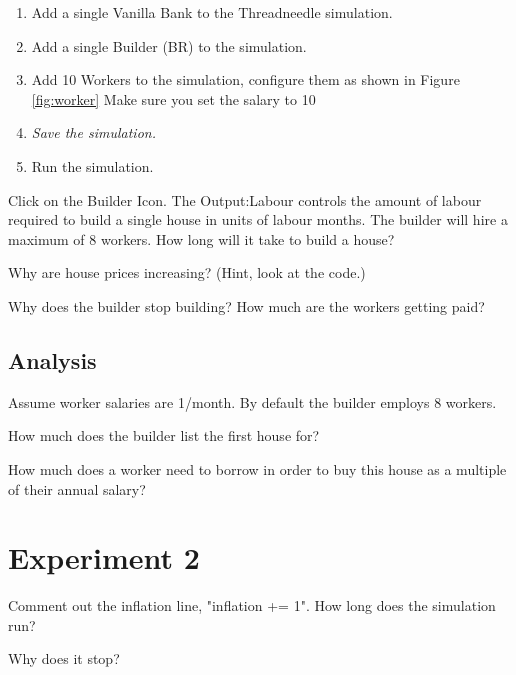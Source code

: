 \documentclass{article}
\begin{document}
\begin{enumerate}
\item Add a single Vanilla Bank to the Threadneedle simulation.
\item Add a single Builder (BR) to the simulation.
\item Add 10 Workers to the simulation, configure them as shown in
Figure \ref{fig:worker} Make sure you set the salary to 10
\item \emph{Save the simulation.}
\item Run the simulation.
\end{enumerate}

Click on the Builder Icon. The Output:Labour controls the amount
of labour required to build a single house in units of labour months. 
The builder will hire a maximum of 8 workers. 
\vspace{0.5cm}
How long will it take to build a house?

\vspace{0.5cm}
Why are house prices increasing? (Hint, look at the code.)

\vspace{0.5cm}
Why does the builder stop building?
\vspace{0.5cm}
How much are the workers getting paid?


\subsection*{Analysis}
Assume worker salaries are 1/month. By default the builder employs
8 workers.

How much does the builder list the first house for?

How much does a worker need to borrow in order to buy this house
as a multiple of their annual salary?
\section{Experiment 2}
Comment out the inflation line, "inflation += 1". 
\vspace{0.5cm}
How long does the simulation run?

\vspace{0.5cm}

Why does it stop?
\vspace{0.5cm}
\newpage
\end{document}
